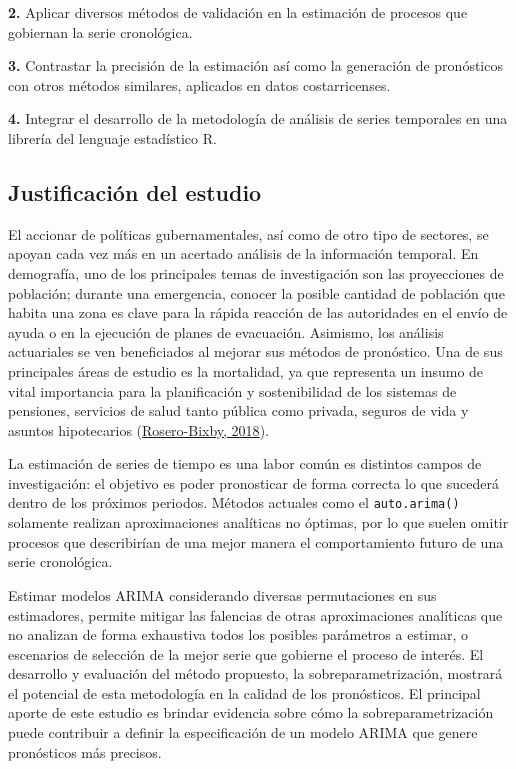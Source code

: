 \documentclass[
]{article}
\begin{document}
\textbf{2.} Aplicar diversos métodos de validación en la estimación de
procesos que gobiernan la serie cronológica.

\textbf{3.} Contrastar la precisión de la estimación así como la
generación de pronósticos con otros métodos similares, aplicados en
datos costarricenses.

\textbf{4.} Integrar el desarrollo de la metodología de análisis de
series temporales en una librería del lenguaje estadístico R.

\subsection{Justificación del estudio}

El accionar de políticas gubernamentales, así como de otro tipo de
sectores, se apoyan cada vez más en un acertado análisis de la
información temporal. En demografía, uno de los principales temas de
investigación son las proyecciones de población; durante una emergencia,
conocer la posible cantidad de población que habita una zona es clave
para la rápida reacción de las autoridades en el envío de ayuda o en la
ejecución de planes de evacuación. Asimismo, los análisis actuariales se
ven beneficiados al mejorar sus métodos de pronóstico. Una de sus
principales áreas de estudio es la mortalidad, ya que representa un
insumo de vital importancia para la planificación y sostenibilidad de
los sistemas de pensiones, servicios de salud tanto pública como
privada, seguros de vida y asuntos hipotecarios
(\protect\hyperlink{ref-supenprodc}{Rosero-Bixby, 2018}).

La estimación de series de tiempo es una labor común es distintos campos
de investigación: el objetivo es poder pronosticar de forma correcta lo
que sucederá dentro de los próximos periodos. Métodos actuales como el
\texttt{auto.arima()} solamente realizan aproximaciones analíticas no
óptimas, por lo que suelen omitir procesos que describirían de una mejor
manera el comportamiento futuro de una serie cronológica.

Estimar modelos ARIMA considerando diversas permutaciones en sus
estimadores, permite mitigar las falencias de otras aproximaciones
analíticas que no analizan de forma exhaustiva todos los posibles
parámetros a estimar, o escenarios de selección de la mejor serie que
gobierne el proceso de interés. El desarrollo y evaluación del método
propuesto, la sobreparametrización, mostrará el potencial de esta
metodología en la calidad de los pronósticos. El principal aporte de
este estudio es brindar evidencia sobre cómo la sobreparametrización
puede contribuir a definir la especificación de un modelo ARIMA que
genere pronósticos más precisos.
\end{document}
